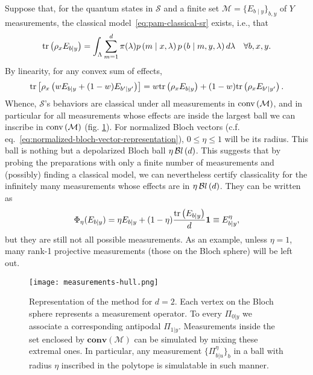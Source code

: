         Suppose that, for the quantum states in $\mathcal{S}$ and a finite set $\mathcal{M} = \{ E_{b \mid y} \}_{b,y}$ of $Y$ measurements, the classical model~\eqref{eq:pam-classical-sr} exists, i.e., that
        \begin{equation}
            \text{tr}\left( \rho_x E_{b\mid y} \right) = \int_{\Lambda} \sum_{m = 1}^{d} \pi(\lambda) p \left( m \mid x,\lambda \right) p \left( b \mid m,y,\lambda \right) d\lambda \quad\forall b,x,y .
        \label{eq:quantum-classicality-model}
        \end{equation}
        By linearity, for any convex sum of effects,
        \begin{equation*}
            \text{tr}\left[ \rho_x \left( w E_{b\mid y} + (1-w) E_{b^\prime \mid y^\prime} \right) \right] = w\text{tr}\left( \rho_x E_{b\mid y} \right) + (1-w) \text{tr}\left( \rho_x E_{b^\prime \mid y^\prime} \right) .
        \end{equation*}
        Whence, $\mathcal{S}$'s behaviors are classical under all measurements in $\text{conv} \left( \mathcal{M} \right)$, and in particular for all measurements whose effects are inside the largest ball we can inscribe in $\text{conv} \left( \mathcal{M} \right)$ (fig. \ref{fig:measurements-hull}). For normalized Bloch vectors (c.f. eq.~\eqref{eq:normalized-bloch-vector-representation}), $0 \leq \eta \leq 1$ will be its radius. This ball is nothing but a depolarized Bloch ball $\eta \, \mathcal{B}l\left( d \right)$. This suggests that by probing the preparations with only a finite number of measurements and (possibly) finding a classical model, we can nevertheless certify classicality for the infinitely many measurements whose effects are in $\eta \, \mathcal{B}l\left( d \right)$. They can be written as
        \begin{equation}
            \Phi_\eta(E_{b \mid y}) = \eta E_{b \mid y} + (1 - \eta) \frac{ \text{tr}\left( E_{b \mid y} \right) }{d} \mathbf{1} \equiv E_{b \mid y}^\eta,
            \label{depolarized-measurements}
        \end{equation}
        but they are still not all possible measurements. As an example, unless $\eta = 1$, many rank-1 projective measurements (those on the Bloch sphere) will be left out.

		\begin{figure}
			\begin{minipage}[c]{0.42\textwidth}
				\centering
            	\texttt{[image: measurements-hull.png]}
			\end{minipage}
			\begin{minipage}[c]{0.56\textwidth}
            	\caption{Representation of the method for $d = 2$. Each vertex on the Bloch sphere represents a measurement operator. To every $\Pi_{0 \vert y}$ we associate a corresponding antipodal $\Pi_{1 \vert y}$. Measurements inside the set enclosed by $\textbf{conv}(\mathcal{M})$ can be simulated by mixing these extremal ones. In particular, any measurement $\{ \Pi_{b \vert u}^\eta \}_b$ in a ball with radius $\eta$ inscribed in the polytope is simulatable in such manner.}
   		    	\label{fig:measurements-hull}
			\end{minipage}
		\end{figure}


